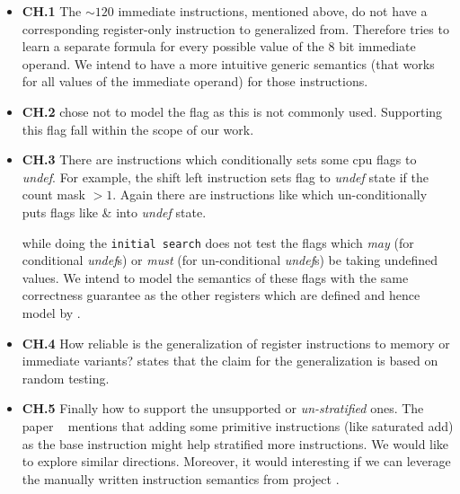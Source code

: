 \begin{itemize}
           
    \item 
    \textbf{CH.1} The $\sim120$ immediate instructions, mentioned above, 
    do not have a corresponding register-only instruction to generalized from. 
    Therefore \Strata tries to learn a separate formula
    for every possible value of the 8 bit immediate operand.
    We intend to have a more intuitive generic semantics (that works for all values of the immediate operand) for those instructions. 

    \item \textbf{CH.2} \Strata chose not to model the  flag as this is not commonly used. Supporting this flag fall within the scope of our work.
      
    \item \textbf{CH.3} There are instructions which conditionally sets some
    cpu flags to \emph{undef}. For example, the shift left instruction
     sets flag  to \emph{undef} state if the
    count mask $>1$.  Again there are instructions like  which un-conditionally puts flags like  \&  into
      \emph{undef} state.
 
    \Strata while doing the {\tt initial search} does not test the flags which
    \emph{may} (for conditional \emph{undef}s)  or \emph{must} (for
        un-conditional \emph{undef}s) be taking undefined values. We intend to
    model the semantics of these flags with the same correctness guarantee as
    the other registers which are defined and hence model by \Strata.
    
    \item \textbf{CH.4} How reliable is the generalization of register
    instructions to memory or immediate variants? \Strata states that the claim
    for the generalization is based on random testing.
    
    \item \textbf{CH.5} Finally how to support the unsupported or
    \emph{un-stratified} ones. The paper ~\cite{Heule2016a} mentions that adding
    some primitive instructions (like saturated add) as the base instruction
    might help stratified more instructions. We would like to explore similar
    directions. Moreover, it would interesting if we can leverage the manually written instruction semantics from project \Stoke.      

\end{itemize} 

